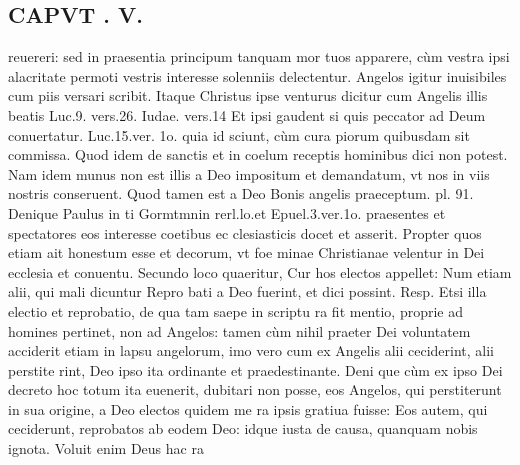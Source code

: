 \documentclass{article}
\begin{document}
\begin{pages}
\section*{CAPVT . V. }
\marginpar{[ p.333 ]}\pstart reuereri: sed in praesentia principum tanquam mor tuos apparere, cùm vestra ipsi alacritate permoti vestris interesse solenniis delectentur. Angelos igitur inuisibiles cum piis versari scribit. Itaque Christus ipse venturus dicitur cum Angelis illis beatis Luc.9. vers.26. Iudae. vers.14 Et ipsi gaudent si quis peccator ad Deum conuertatur. Luc.15.ver. 1o. quia id sciunt, cùm cura piorum quibusdam sit commissa. Quod idem de sanctis et in coelum receptis hominibus dici non potest. Nam idem munus non est illis a Deo impositum et demandatum, vt nos in viis nostris conseruent. Quod tamen est a Deo Bonis angelis praeceptum. pl. 91. Denique Paulus in ti Gormtmnin rerl.lo.et Epuel.3.ver.1o. praesentes et spectatores eos interesse coetibus ec clesiasticis docet et asserit. Propter quos etiam ait honestum esse et decorum, vt foe minae Christianae velentur in Dei ecclesia et conuentu.  \pend\pstart Secundo loco quaeritur, Cur hos electos appellet: Num etiam alii, qui mali dicuntur Repro bati a Deo fuerint, et dici possint. Resp. Etsi illa electio et reprobatio, de qua tam saepe in scriptu ra fit mentio, proprie ad homines pertinet, non ad Angelos: tamen cùm nihil praeter Dei voluntatem acciderit etiam in lapsu angelorum, imo vero cum ex Angelis alii ceciderint, alii perstite rint, Deo ipso ita ordinante et praedestinante. Deni que cùm ex ipso Dei decreto hoc totum ita euenerit, dubitari non posse, eos Angelos, qui perstiterunt in sua origine, a Deo electos quidem me ra ipsis gratiua fuisse: Eos autem, qui ceciderunt, reprobatos ab eodem Deo: idque iusta de causa, quanquam nobis ignota. Voluit enim Deus hac ra\pend

\end{pages}
\end{document}
